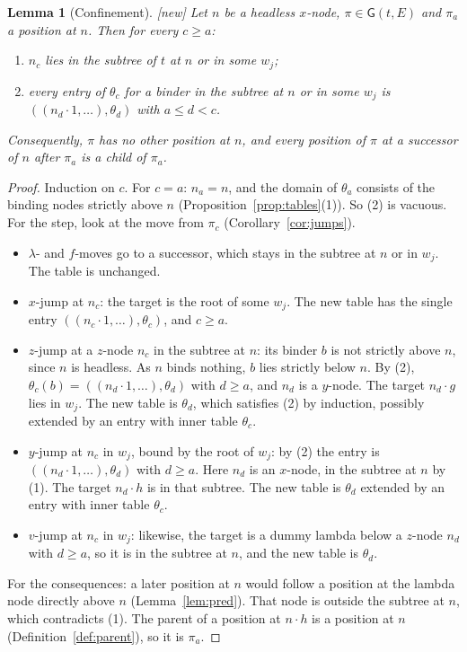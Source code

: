 \documentclass[11pt]{article}
\newcommand{\Gm}{\mathsf{G}}
\newcommand{\suc}[2]{#1{\cdot}#2}
\newcommand{\New}{\textsf{[new]}}
\theoremstyle{plain}
\newtheorem{lemma}[theorem]{Lemma}
\theoremstyle{definition}
\theoremstyle{remark}
\begin{document}
\begin{lemma}[Confinement]\label{lem:confine}
\New{} Let $n$ be a headless $x$-node, $\pi\in\Gm(t,E)$ and $\pi_a$ a
position at $n$.  Then for every $c\ge a$:
\begin{enumerate}
\item $n_c$ lies in the subtree of $t$ at $n$ or in some $w_j$;
\item every entry of $\theta_c$ for a binder in the subtree at $n$ or in
  some $w_j$ is $((\suc{n_d}1,\dots),\theta_d)$ with $a\le d<c$.
\end{enumerate}
Consequently, $\pi$ has no other position at $n$, and every position of
$\pi$ at a successor of $n$ after $\pi_a$ is a child of $\pi_a$.
\end{lemma}
\begin{proof}
Induction on $c$.  For $c=a$: $n_a=n$, and the domain of $\theta_a$
consists of the binding nodes strictly above $n$
(Proposition~\ref{prop:tables}(1)).  So (2) is vacuous.  For the step,
look at the move from $\pi_c$ (Corollary~\ref{cor:jumps}).
\begin{itemize}
\item $\lambda$- and $f$-moves go to a successor, which stays in the
  subtree at $n$ or in $w_j$.  The table is unchanged.
\item $x$-jump at $n_c$: the target is the root of some $w_j$.  The new
  table has the single entry $((\suc{n_c}1,\dots),\theta_c)$, and
  $c\ge a$.
\item $z$-jump at a $z$-node $n_c$ in the subtree at $n$: its binder $b$
  is not strictly above $n$, since $n$ is headless.  As $n$ binds
  nothing, $b$ lies strictly below $n$.  By (2), $\theta_c(b)=
  ((\suc{n_d}1,\dots),\theta_d)$ with $d\ge a$, and $n_d$ is a $y$-node.
  The target $\suc{n_d}g$ lies in $w_j$.  The new table is $\theta_d$,
  which satisfies (2) by induction, possibly extended by an entry with
  inner table $\theta_c$.
\item $y$-jump at $n_c$ in $w_j$, bound by the root of $w_j$: by (2) the
  entry is $((\suc{n_d}1,\dots),\theta_d)$ with $d\ge a$.  Here $n_d$ is
  an $x$-node, in the subtree at $n$ by (1).  The target $\suc{n_d}h$ is
  in that subtree.  The new table is $\theta_d$ extended by an entry
  with inner table $\theta_c$.
\item $v$-jump at $n_c$ in $w_j$: likewise, the target is a dummy lambda
  below a $z$-node $n_d$ with $d\ge a$, so it is in the subtree at $n$,
  and the new table is $\theta_d$.
\end{itemize}
For the consequences: a later position at $n$ would follow a position at
the lambda node directly above $n$ (Lemma~\ref{lem:pred}).  That node
is outside the subtree at $n$, which contradicts (1).  The parent of a
position at $\suc nh$ is a position at $n$ (Definition~\ref{def:parent}),
so it is $\pi_a$.
\end{proof}
\end{document}
